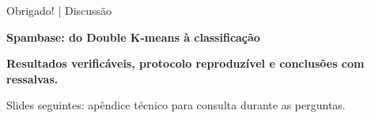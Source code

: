 \documentclass[aspectratio=169,11pt]{beamer}
\begin{document}
\begin{frame}[t]{Obrigado! | Discussão}

\vspace{1.1cm}\begin{center}
{\fontsize{24}{28}\selectfont\bfseries\color{cinazul}Spambase: do Double K-means à classificação}
\vspace{6mm}\par
\small\textbf{Resultados verificáveis, protocolo reproduzível e conclusões com ressalvas.}
\vspace{7mm}\par
\scriptsize Slides seguintes: apêndice técnico para consulta durante as perguntas.
\end{center}

\end{frame}
\end{document}
